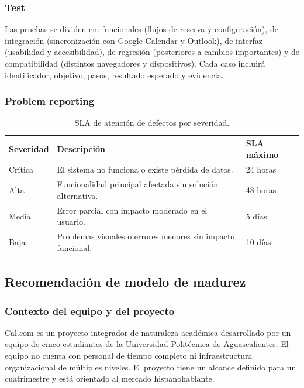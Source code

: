 \documentclass{article}
\begin{document}
\subsubsection{Test}
Las pruebas se dividen en: funcionales (flujos de reserva y configuración), de integración (sincronización con Google Calendar y Outlook), de interfaz (usabilidad y accesibilidad), de regresión (posteriores a cambios importantes) y de compatibilidad (distintos navegadores y dispositivos). Cada caso incluirá identificador, objetivo, pasos, resultado esperado y evidencia.

\subsubsection{Problem reporting}

\begin{table}[H]
\centering
\begin{tabular}{|p{2cm}|p{5cm}|p{3cm}|}
\hline
\textbf{Severidad} & \textbf{Descripción} & \textbf{SLA máximo} \\
\hline
Crítica & El sistema no funciona o existe pérdida de datos. & 24 horas \\
\hline
Alta & Funcionalidad principal afectada sin solución alternativa. & 48 horas \\
\hline
Media & Error parcial con impacto moderado en el usuario. & 5 días \\
\hline
Baja & Problemas visuales o errores menores sin impacto funcional. & 10 días \\
\hline
\end{tabular}
\caption{SLA de atención de defectos por severidad.}
\end{table}

\subsection{Recomendación de modelo de madurez}

\subsubsection{Contexto del equipo y del proyecto}
Cal.com es un proyecto integrador de naturaleza académica desarrollado por un equipo de cinco estudiantes de la Universidad Politécnica de Aguascalientes. El equipo no cuenta con personal de tiempo completo ni infraestructura organizacional de múltiples niveles. El proyecto tiene un alcance definido para un cuatrimestre y está orientado al mercado hispanohablante.
\end{document}
